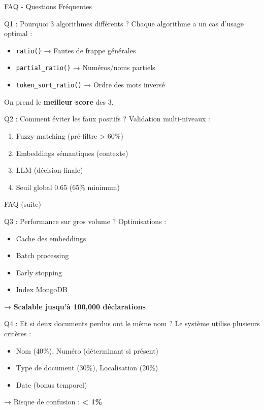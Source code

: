 \documentclass[aspectratio=169]{beamer}
\begin{document}
\begin{frame}{FAQ - Questions Fréquentes}
    \begin{block}{Q1 : Pourquoi 3 algorithmes différents ?}
        Chaque algorithme a un cas d'usage optimal :
        \begin{itemize}
            \item \texttt{ratio()} → Fautes de frappe générales
            \item \texttt{partial\_ratio()} → Numéros/noms partiels
            \item \texttt{token\_sort\_ratio()} → Ordre des mots inversé
        \end{itemize}
        On prend le \textbf{meilleur score} des 3.
    \end{block}

    \vspace{0.3cm}

    \begin{block}{Q2 : Comment éviter les faux positifs ?}
        Validation multi-niveaux :
        \begin{enumerate}
            \item Fuzzy matching (pré-filtre > 60\%)
            \item Embeddings sémantiques (contexte)
            \item LLM (décision finale)
            \item Seuil global 0.65 (65\% minimum)
        \end{enumerate}
    \end{block}
\end{frame}

\begin{frame}{FAQ (suite)}
    \begin{block}{Q3 : Performance sur gros volume ?}
        Optimisations :
        \begin{itemize}
            \item Cache des embeddings
            \item Batch processing
            \item Early stopping
            \item Index MongoDB
        \end{itemize}
        → \textbf{Scalable jusqu'à 100,000 déclarations}
    \end{block}

    \vspace{0.3cm}

    \begin{block}{Q4 : Et si deux documents perdus ont le même nom ?}
        Le système utilise plusieurs critères :
        \begin{itemize}
            \item Nom (40\%), Numéro (déterminant si présent)
            \item Type de document (30\%), Localisation (20\%)
            \item Date (bonus temporel)
        \end{itemize}
        → Risque de confusion : \textbf{< 1\%}
    \end{block}
\end{frame}
\end{document}
